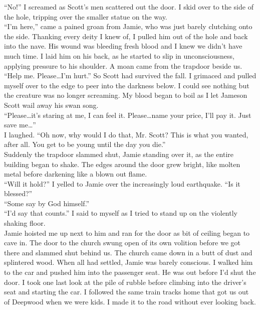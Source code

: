 \documentclass[a5paper]{scrartcl}
\begin{document}
\enquote{No!} I screamed as Scott's men scattered out the door. I skid over to the side of the hole, tripping over the smaller statue on the way.\\


\enquote{I'm here,} came a pained groan from Jamie, who was just barely clutching onto the side. Thanking every deity I knew of, I pulled him out of the hole and back into the nave. His wound was bleeding fresh blood and I knew we didn't have much time. I laid him on his back, as he started to slip in unconsciousness, applying pressure to his shoulder. A moan came from the trapdoor beside us.\\


\enquote{Help me. Please\dots  I'm hurt.} So Scott had survived the fall. I grimaced and pulled myself over to the edge to peer into the darkness below. I could see nothing but the creature was no longer screaming. My blood began to boil as I let Jameson Scott wail away his swan song. \\


\enquote{Please\dots it's staring at me, I can feel it. Please\dots name your price, I'll pay it. Just save me\dots }\\


I laughed. \enquote{Oh now, why would I do that, Mr. Scott? This is what you wanted, after all. You get to be young until the day you die.} \\


Suddenly the trapdoor slammed shut, Jamie standing over it, as the entire building began to shake. The edges around the door grew bright, like molten metal before darkening like a blown out flame.\\


\enquote{Will it hold?} I yelled to Jamie over the increasingly loud earthquake. \enquote{Is it blessed?}\\


\enquote{Some say by God himself.}\\


\enquote{I'd say that counts.} I said to myself as I tried to stand up on the violently shaking floor.\\


Jamie hoisted me up next to him and ran for the door as bit of ceiling began to cave in. The door to the church swung open of its own volition before we got there and slammed shut behind us. The church came down in a butt of dust and splintered wood. When all had settled, Jamie was barely conscious. I walked him to the car and pushed him into the passenger seat. He was out before I'd shut the door. I took one last look at the pile of rubble before climbing into the driver's seat and starting the car. I followed the same train tracks home that got us out of Deepwood when we were kids. I made it to the road without ever looking back.\\
\end{document}
